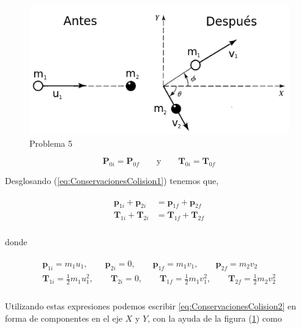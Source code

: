\documentclass[a4paper,10pt]{article}
\numberwithin{equation}{section}
\begin{document}
\begin{figure}[ht]
 \centering
\includegraphics[scale=0.5]{problema5fig1}
\caption{Problema 5}
\label{fig:problema5}
\end{figure}


\begin{equation}
 \mathbf{P}_{0i} = \mathbf{P}_{0f} \qquad \text{y} \qquad \mathbf{T}_{0i} = \mathbf{T}_{0f}
 \label{eq:ConservacionesColision1}
\end{equation}

Desglosando (\ref{eq:ConservacionesColision1}) tenemos que,

\begin{gather}
 \begin{split}
  \mathbf{p}_{1i} +  \mathbf{p}_{2i} &=   \mathbf{p}_{1f} +  \mathbf{p}_{2f} \\
  \mathbf{T}_{1i} +  \mathbf{T}_{2i} &=   \mathbf{T}_{1f} +  \mathbf{T}_{2f} \\
 \label{eq:ConservacionesColision2}
 \end{split}
\end{gather}

donde

\begin{gather*}
 \begin{split}
%
\mathbf{p}_{1i} = m_1 u_1, \qquad \mathbf{p}_{2i} = 0, \qquad \mathbf{p}_{1f} = m_1 v_1, \qquad \mathbf{p}_{2f} = m_2 v_2 \\
%
\mathbf{T}_{1i} = \frac{1}{2} m_1 u_1^2, \qquad \mathbf{T}_{2i} = 0, \qquad \mathbf{T}_{1f} = \frac{1}{2} m_1 v_1^2, \qquad \mathbf{T}_{2f} = \frac{1}{2} m_2 v_2^2 \\
%
 \end{split}
\end{gather*}

Utilizando estas expresiones podemos escribir \ref{eq:ConservacionesColision2} en forma de componentes
en el eje $X$ y $Y$, con la ayuda de la figura (\ref{fig:problema5}) como
\end{document}
